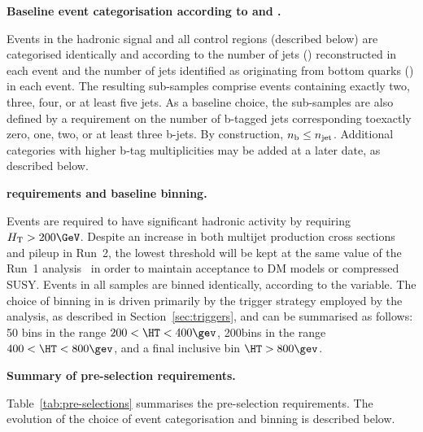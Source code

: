 {\bf Baseline event categorisation according to \njet and \nb.} 

Events in the hadronic signal and all control regions (described
below) are categorised identically and according to the number of jets
(\njet) reconstructed in each event and the number of jets identified
as originating from bottom quarks (\nb) in each event. The resulting
sub-samples comprise events containing exactly two, three, four, or at
least five jets. As a baseline choice, the sub-samples are also
defined by a requirement on the number of b-tagged jets corresponding
toexactly zero, one, two, or at least three b-jets. By construction,
$n_{\text{b}} \leq n_{\text{jet}}$. Additional categories with higher b-tag
multiplicities may be added at a later date, as described below. 

{\bf \HT requirements and baseline \HT binning.} 

Events are required to have significant hadronic activity by requiring
$\scalht > 200\GeV$. Despite an increase in both multijet production
cross sections and pileup in Run~2, the lowest \HT threshold will be
kept at the same value of the Run~1 analysis~\cite{Chatrchyan:2013lya}
in order to maintain acceptance to DM models or compressed
SUSY. Events in all samples are binned identically, according to the
\HT variable. The choice of binning in \HT is driven primarily by the
trigger strategy employed by the analysis, as described in
Section~\ref{sec:triggers}, and can be summarised as follows: 50\gev
bins in the range $200 < \HT < 400\gev$, 200\gev bins in the range
$400 < \HT < 800\gev$, and a final inclusive bin $\HT > 800\gev$.

{\bf Summary of pre-selection requirements.} 

Table~\ref{tab:pre-selections} summarises the pre-selection
requirements. The evolution of the choice of event categorisation and
\HT binning is described below.

